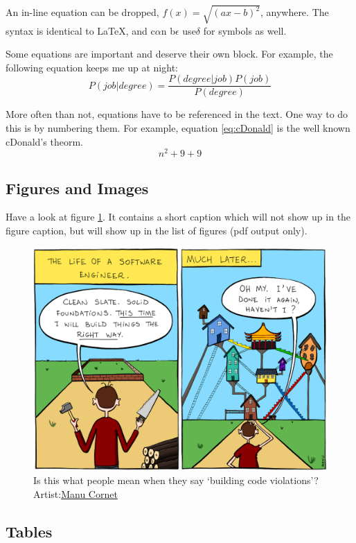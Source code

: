 \documentclass[]{article}
\begin{document}
An in-line equation can be dropped, \(f(x) = \sqrt{(ax - b)^2}\),
anywhere. The syntax is identical to LaTeX, and c\(\alpha\)n
b\(\epsilon\) use\(\delta\) for symbols as well.

Some equations are important and deserve their own block. For example,
the following equation keeps me up at night: \[
P(job|degree) = \frac{P(degree|job) P(job)}{P(degree)}
\]

More often than not, equations have to be referenced in the text. One
way to do this is by numbering them. For example, equation
\ref{eq:cDonald} is the well known cDonald's theorm.
\begin{equation} \label{eq:cDonald}
n^2 + 9 + 9
\end{equation}
\subsection{Figures and Images}\label{figures-and-images}

Have a look at figure \ref{fig:LifeOfSWE}. It contains a short caption
which will not show up in the figure caption, but will show up in the
list of figures (pdf output only).

\begin{figure}[htbp]
\centering
\includegraphics{imgs/manu-LifeOfSWE.png}
\caption[Comic: Life of a software engineer]{ Is this what people
mean when they say `building code violations'?
Artist:\href{http://www.bonkersworld.net/building-software/}{Manu
Cornet} \label{fig:LifeOfSWE}}
\end{figure}

\subsection{Tables}\label{tables}
\end{document}
